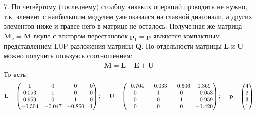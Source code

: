 \documentclass[a4paper]{article}
\begin{document}
7. По четвёртому (последнему) столбцу никаких операций проводить не нужно, т.к. элемент с наибольшим модулем уже оказался на главной диагонали, а других элементов ниже и правее него в матрице не осталось. Полученная же матрица $\mathbf{M}_5=\mathbf{M}$ вкупе с вектором перестановок $\mathbf{p}_1=\mathbf{p}$ являются компактным представлением LUP-разложения матрицы $\mathbf{Q}$. По-отдельности матрицы $\mathbf{L}$ и $\mathbf{U}$ можно получить пользуясь соотношением:
\begin{align}
    \mathbf{M} = \mathbf{L} - \mathbf{E} + \mathbf{U}
\end{align}
То есть:
\begin{align}
\mathbf{L} =
\begin{pmatrix}
    1    &  0    &  0    &  0\\
    0.053&  1    &  0    &  0\\
    0.959&  0    &  1    &  0\\
   -0.304& -0.047& -0.860&  1
\end{pmatrix}; \hspace{0.5cm}
\mathbf{U} =
\begin{pmatrix}
   -0.704& -0.033& -0.606&  0.369\\
    0    &  1    &  0    & -0.053\\
    0    &  0    &  1    & -0.959\\
    0    &  0    &  0    & -1.420
\end{pmatrix}; \hspace{0.5cm}
\mathbf{p} =
\begin{pmatrix}
    4 \\ 2 \\ 3 \\ 1
\end{pmatrix}
\end{align}
\end{document}
